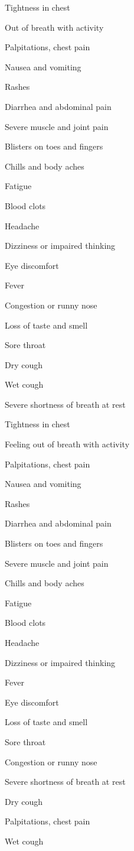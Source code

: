 Tightness in chest

Out of breath with activity

Palpitations, chest pain

Nausea and vomiting

Rashes

Diarrhea and abdominal pain

Severe muscle and joint pain

Blisters on toes and fingers

Chills and body aches

Fatigue

Blood clots

Headache

Dizziness or impaired thinking

Eye discomfort

Fever

Congestion or runny nose

Loss of taste and smell

Sore throat

Dry cough

Wet cough

Severe shortness of breath at rest

Tightness in chest

Feeling out of breath with activity

Palpitations, chest pain

Nausea and vomiting

Rashes

Diarrhea and abdominal pain

Blisters on toes and fingers

Severe muscle and joint pain

Chills and body aches

Fatigue

Blood clots

Headache

Dizziness or impaired thinking

Fever

Eye discomfort

Loss of taste and smell

Sore throat

Congestion or runny nose

Severe shortness of breath at rest

Dry cough

Palpitations, chest pain

Wet cough

